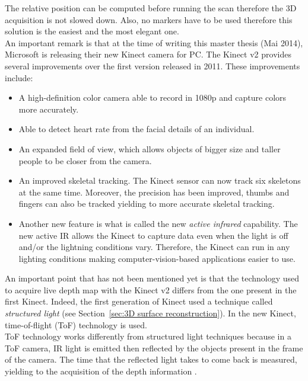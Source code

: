 The relative position can be computed before running the scan therefore the 3D acquisition is not slowed down. Also, no markers have to be used therefore this solution is the easiest and the most elegant one.\\

An important remark is that at the time of writing this master thesis (Mai 2014), Microsoft is releasing their new Kinect camera for PC. The Kinect v2 provides several improvements over the first version released in 2011. These improvements include:\\

\begin{itemize}
  \item A high-definition color camera able to record in 1080p and capture colors more accurately.
  \item Able to detect heart rate from the facial details of an individual.
  \item An expanded field of view, which allows objects of bigger size and taller people to be closer from the camera.
  \item An improved skeletal tracking. The Kinect sensor can now track six skeletons at the same time. Moreover, the precision has been improved, thumbs and fingers can also be tracked yielding to more accurate skeletal tracking.
  \item Another new feature is what is called the new \textit{active infrared} capability. The new active IR allows the Kinect to capture data even when the light is off and/or the lightning conditions vary. Therefore, the Kinect can run in any lighting conditions making computer-vision-based applications easier to use. 
\end{itemize}


An important point that has not been mentioned yet is that the technology used to acquire live depth map with the Kinect v2 differs from the one present in the first Kinect. Indeed, the first generation of Kinect used a technique called \textit{structured light} (see Section~\ref{sec:3D surface reconstruction}). In the new Kinect, time-of-flight (ToF) technology is used. \\

ToF technology works differently from structured light techniques because in a ToF camera, IR light is emitted then reflected by the objects present in the frame of the camera. The time that the reflected light takes to come back is measured, yielding to the acquisition of the depth information \cite{kolb_time--flight_2010}.\\

